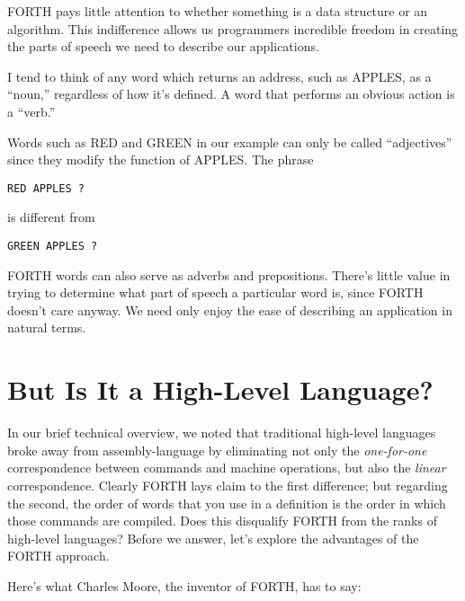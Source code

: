 FORTH pays little attention to whether something is a data structure
or an algorithm. This indifference allows us programmers incredible
freedom in creating the parts of speech we need to describe our applications.

I tend to think of any word which returns an address, such as APPLES,
as a {}``noun,'' regardless of how it's defined. A word that performs
an obvious action is a {}``verb.''

Words such as RED and GREEN in our example can only be called {}``adjectives''
since they modify the function of APPLES. The phrase

\begin{verbatim}
RED APPLES ?
\end{verbatim}
is different from

\begin{verbatim}
GREEN APPLES ?
\end{verbatim}
FORTH words can also serve as adverbs and prepositions. There's little
value in trying to determine what part of speech a particular word
is, since FORTH doesn't care anyway. We need only enjoy the ease of
describing an application in natural terms.


\section{But Is It a High-Level Language?}

In our brief technical overview, we noted that traditional high-level
languages broke away from assembly-language by eliminating not only
the \emph{one-for-one} correspondence between commands and machine
operations, but also the \emph{linear} correspondence. Clearly FORTH
lays claim to the first difference; but regarding the second, the
order of words that you use in a definition is the order in which
those commands are compiled. Does this disqualify FORTH from the ranks
of high-level languages? Before we answer, let's explore the advantages
of the FORTH approach.


Here's what Charles Moore, the inventor of FORTH, has to say:


